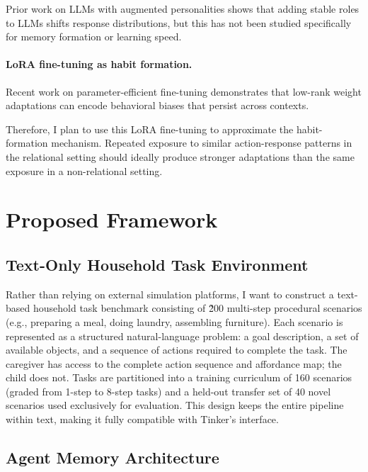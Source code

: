 \documentclass[11pt]{article}
\begin{document}
Prior work on LLMs with augmented personalities \citep{shao2023character} shows that adding stable roles to LLMs shifts response distributions, but this has not been studied specifically for memory formation or learning speed.

\paragraph{LoRA fine-tuning as habit formation.}
Recent work on parameter-efficient fine-tuning \citep{hu2022lora} demonstrates that low-rank weight adaptations can encode behavioral biases that persist across contexts. 

Therefore, I plan to use this LoRA fine-tuning to approximate the habit-formation mechanism. Repeated exposure to similar action-response patterns in the relational setting should ideally produce stronger adaptations than the same exposure in a non-relational setting.

\section{Proposed Framework}

\subsection{Text-Only Household Task Environment}

Rather than relying on external simulation platforms, I want to construct a text-based household task benchmark consisting of \~200 multi-step procedural scenarios (e.g., preparing a meal, doing laundry, assembling furniture). Each scenario is represented as a structured natural-language problem: a goal description, a set of available objects, and a sequence of actions required to complete the task. The caregiver has access to the complete action sequence and affordance map; the child does not. Tasks are partitioned into a training curriculum of 160 scenarios (graded from 1-step to 8-step tasks) and a held-out transfer set of 40 novel scenarios used exclusively for evaluation. This design keeps the entire pipeline within text, making it fully compatible with Tinker's interface.

\subsection{Agent Memory Architecture}
\end{document}
